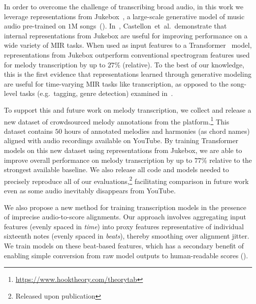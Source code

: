 In order to overcome the challenge of transcribing broad audio, in this work we leverage representations from Jukebox~\cite{dhariwal2020jukebox}, a large-scale generative model of music audio pre-trained on $1$M songs~(). 
In~\cite{castellon2021calm}, Castellon~et~al.\ demonstrate that internal representations from Jukebox are useful for improving performance on a wide variety of MIR tasks. 
When used as input features to a Transformer~\cite{vaswani2017attention} model, representations from Jukebox outperform conventional spectrogram features used for melody transcription by 
up to $27$\% (relative). 
To the best of our knowledge, this is the first evidence that representations learned through generative modeling are useful for time-varying MIR tasks like transcription, as opposed to the song-level tasks (e.g.~tagging, genre detection) examined in~\cite{castellon2021calm}.

To support this and future work on melody transcription, we collect and release a new dataset of crowdsourced melody annotations from the \hooktheory{} platform.\footnote{\url{https://www.hooktheory.com/theorytab}} 
This dataset contains $50$ hours of annotated melodies and harmonies (as chord names) aligned with audio recordings available on YouTube. 
By training Transformer models on this new dataset using representations from Jukebox, we are able to improve overall performance on melody transcription by 
up to $77$\% 
relative to the strongest available baseline. 
We also release all code and models needed to precisely reproduce all of our evaluations,\footnote{Released upon publication} facilitating comparison in future work even as some audio inevitably disappears from YouTube.

We also propose a new method for training transcription models in the presence of imprecise audio-to-score alignments. 
Our approach 
involves aggregating input features (evenly spaced in \emph{time}) into proxy features representative of individual sixteenth notes (evenly spaced in \emph{beats}), 
thereby smoothing over alignment jitter. 
We train models on these beat-based features, 
which has a secondary benefit of enabling simple conversion from raw model outputs to human-readable scores ().

